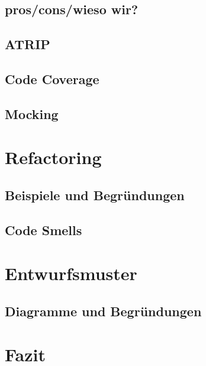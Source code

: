 \documentclass{article}
\begin{document}
\subsection{pros/cons/wieso wir?}
\subsection{ATRIP}
\subsection{Code Coverage}
\subsection{Mocking}

\section{Refactoring}
\subsection{Beispiele und Begründungen}
\subsection{Code Smells}

\section{Entwurfsmuster}
\subsection{Diagramme und Begründungen}

\section{Fazit}\label{sec:end}
\end{document}
